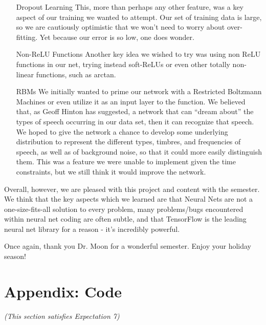 \documentclass[11pt]{article}
\begin{document}
\begin{itemize}
\item[Dropout Learning] This, more than perhaps any other feature, was a key aspect of our training we wanted to attempt. Our set of training data is large, so we are cautiously optimistic that we won't need to worry about over-fitting. Yet because our error is so low, one does wonder.
\item[Non-ReLU Functions] Another key idea we wished to try was using non ReLU functions in our net, trying instead soft-ReLUs or even other totally non-linear functions, such as arctan.
\item[RBMs] We initially wanted to prime our network with a Restricted Boltzmann Machines or even utilize it as an input layer to the function. We believed that, as Geoff Hinton has suggested, a network that can ``dream about'' the types of speech occurring in our data set, then it can recognize that speech. We hoped to give the network a chance to develop some underlying distribution to represent the different types, timbres, and frequencies of speech, as well as of background noise, so that it could more easily distinguish them. This was a feature we were unable to implement given the time constraints, but we still think it would improve the network.
\end{itemize}

Overall, however, we are pleased with this project and content with the semester. We think that the key aspects which we learned are that Neural Nets are not a one-size-fits-all solution to every problem, many problems/bugs encountered within neural net coding are often subtle, and that TensorFlow is the leading neural net library for a reason - it's incredibly powerful.

Once again, thank you Dr. Moon for a wonderful semester. Enjoy your holiday season!




\newpage\section{Appendix: Code}
\textit{(This section satisfies Expectation 7)}








\end{document}
